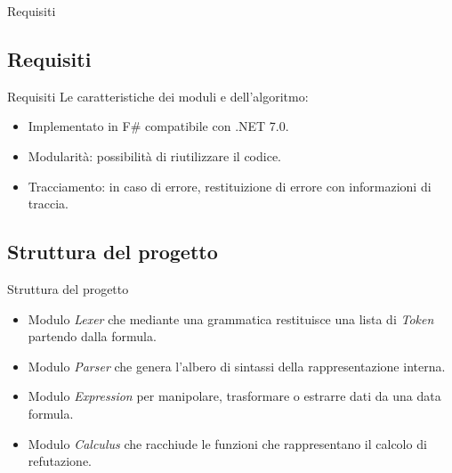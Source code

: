 \documentclass{beamer}
\begin{document}
\begin{darkframes}
\begin{frame}{Requisiti}
    \end{frame}

    \subsection{Requisiti}
    \begin{frame}{Requisiti}
        Le caratteristiche dei moduli e dell'algoritmo:
        \begin{itemize}
            \item Implementato in F\# compatibile con .NET 7.0.
            \item Modularità: possibilità di riutilizzare il codice.
            \item Tracciamento: in caso di errore, restituizione di errore con informazioni di traccia.
        \end{itemize}
    \end{frame}

    \subsection{Struttura del progetto}
    \begin{frame}{Struttura del progetto}
        \begin{itemize}
            \item Modulo \textit{Lexer} che mediante una grammatica restituisce una lista di \textit{Token} partendo dalla formula.
            \item Modulo \textit{Parser} che genera l'albero di sintassi della rappresentazione interna.
            \item Modulo \textit{Expression} per manipolare, trasformare o estrarre dati da una data formula.
            \item Modulo \textit{Calculus} che racchiude le funzioni che rappresentano il calcolo di refutazione.
        \end{itemize}
    \end{frame}


\end{darkframes}
\end{document}
